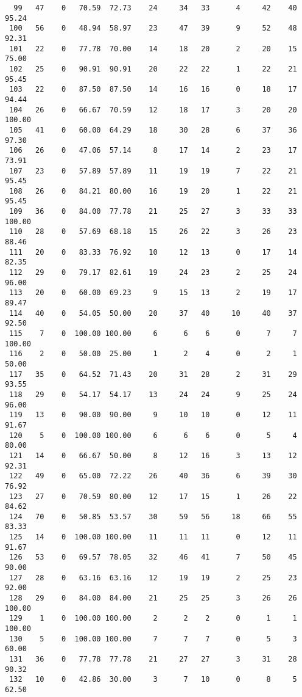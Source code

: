 \begin{verbatim}
  99   47    0   70.59  72.73    24     34   33      4     42    40    95.24
 100   56    0   48.94  58.97    23     47   39      9     52    48    92.31
 101   22    0   77.78  70.00    14     18   20      2     20    15    75.00
 102   25    0   90.91  90.91    20     22   22      1     22    21    95.45
 103   22    0   87.50  87.50    14     16   16      0     18    17    94.44
 104   26    0   66.67  70.59    12     18   17      3     20    20   100.00
 105   41    0   60.00  64.29    18     30   28      6     37    36    97.30
 106   26    0   47.06  57.14     8     17   14      2     23    17    73.91
 107   23    0   57.89  57.89    11     19   19      7     22    21    95.45
 108   26    0   84.21  80.00    16     19   20      1     22    21    95.45
 109   36    0   84.00  77.78    21     25   27      3     33    33   100.00
 110   28    0   57.69  68.18    15     26   22      3     26    23    88.46
 111   20    0   83.33  76.92    10     12   13      0     17    14    82.35
 112   29    0   79.17  82.61    19     24   23      2     25    24    96.00
 113   20    0   60.00  69.23     9     15   13      2     19    17    89.47
 114   40    0   54.05  50.00    20     37   40     10     40    37    92.50
 115    7    0  100.00 100.00     6      6    6      0      7     7   100.00
 116    2    0   50.00  25.00     1      2    4      0      2     1    50.00
 117   35    0   64.52  71.43    20     31   28      2     31    29    93.55
 118   29    0   54.17  54.17    13     24   24      9     25    24    96.00
 119   13    0   90.00  90.00     9     10   10      0     12    11    91.67
 120    5    0  100.00 100.00     6      6    6      0      5     4    80.00
 121   14    0   66.67  50.00     8     12   16      3     13    12    92.31
 122   49    0   65.00  72.22    26     40   36      6     39    30    76.92
 123   27    0   70.59  80.00    12     17   15      1     26    22    84.62
 124   70    0   50.85  53.57    30     59   56     18     66    55    83.33
 125   14    0  100.00 100.00    11     11   11      0     12    11    91.67
 126   53    0   69.57  78.05    32     46   41      7     50    45    90.00
 127   28    0   63.16  63.16    12     19   19      2     25    23    92.00
 128   29    0   84.00  84.00    21     25   25      3     26    26   100.00
 129    1    0  100.00 100.00     2      2    2      0      1     1   100.00
 130    5    0  100.00 100.00     7      7    7      0      5     3    60.00
 131   36    0   77.78  77.78    21     27   27      3     31    28    90.32
 132   10    0   42.86  30.00     3      7   10      0      8     5    62.50

\end{verbatim}
